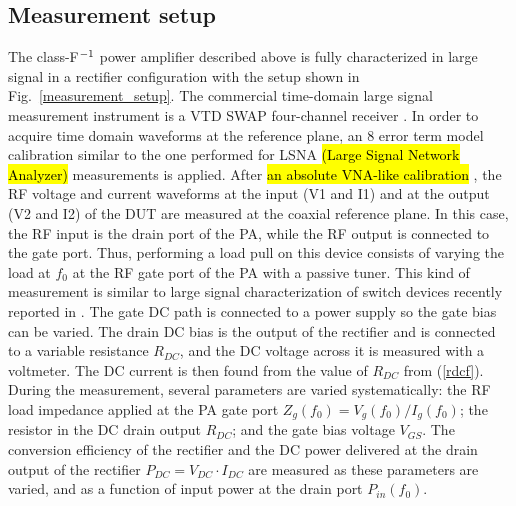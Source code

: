 \subsection {Measurement setup}
%
The class-F$^{\rm -1}$ power amplifier described above is fully characterized in large signal in a rectifier configuration with the setup shown in Fig.~\ref{measurement_setup}. The commercial time-domain large signal measurement instrument is a VTD SWAP four-channel receiver \cite{SWAP}. In order to acquire time domain waveforms at the reference plane, an 8 error term model calibration similar to the one performed for LSNA \hl{(Large Signal Network Analyzer)} measurements is applied. After \hl{an absolute VNA-like calibration} \cite{verspecht}, the RF voltage and current waveforms at the input (V1 and I1) and at the output (V2 and I2) of the DUT are measured at the coaxial reference plane. In this case, the RF input is the drain port of the PA, while the RF output is connected to the gate port. Thus, performing a load pull on this device consists of varying the load at $f_0$ at the RF gate port of the PA with a passive tuner. This kind of measurement is similar to large signal characterization of switch devices recently reported in \cite{switch,faraj_arftg_2012}. The gate DC path is connected to a power supply so the gate bias can be varied. The drain DC bias is the output of the rectifier and is connected to a variable resistance $R_{DC}$, and the DC voltage across it is measured with a voltmeter. The DC current is then found from the value of $R_{DC}$ from (\ref{rdcf}). During the measurement, several parameters are varied systematically: the RF load impedance applied at the PA gate port $Z_g(f_0)=V_g(f_0)/I_g(f_0)$; the resistor in the DC drain output $R_{DC}$; and the gate bias voltage $V_{GS}$. The conversion efficiency of the rectifier and the DC power delivered at the drain output of the rectifier $P_{DC}= V_{DC} \cdot I_{DC}$ are measured as these parameters are varied, and as a function of input power at the drain port $P_{in}(f_0)$.





